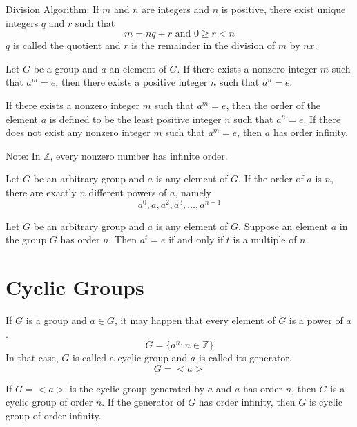 \documentclass[12pt]{article}
\newcommand{\set}[1]{\{ #1 \}}
\newcommand{\integers}{\mathds{Z}}
\begin{document}
\begin{theorem} Division Algorithm: If $m$ and $n$ are integers and $n$ is positive, there exist unique integers $q$ and $r$ such that $$m = nq + r \text{ and } 0 \geq r < n $$ $q$ is called the quotient and $r$ is the remainder in the division of $m$ by $nx$. \end{theorem} 

\begin{definition} Let $G$ be a group and $a$ an element of $G$. If there exists a nonzero integer $m$ such that $a^m = e$, then there exists a positive integer $n$ such that $a^n = e$. \end{definition} 

\begin{definition} If there exists a nonzero integer $m$ such that $a^m = e$, then the order of the element $a$ is defined to be the least positive integer $n$ such that $a^n = e$. If there does not exist any nonzero integer $m$ such that $a^m = e$, then $a$ has order infinity. \end{definition} 

Note: In $\integers$, every nonzero number has infinite order. 

\begin{theorem} Let $G$ be an arbitrary group and $a$ is any element of $G$. If the order of $a$ is $n$, there are exactly $n$ different powers of $a$, namely $$a^0,a, a^2, a^3, \dots, a^{n-1}$$ \end{theorem} 

\begin{theorem} Let $G$ be an arbitrary group and $a$ is any element of $G$. Suppose an element $a$ in the group $G$ has order $n$. Then $a^t = e$ if and only if $t$ is a multiple of $n$. \end{theorem} 

\section{Cyclic Groups}

\begin{definition} If $G$ is a group and $a \in G$, it may happen that every element of $G$ is a power of $a$. $$G = \set{a^n: n \in \integers}$$ In that case, $G$ is called a cyclic group and $a$ is called its generator. $$G = <a>$$ \end{definition} 

\begin{definition} If $G = <a>$ is the cyclic group generated by $a$ and $a$ has order $n$, then $G$ is a cyclic group of order $n$. If the generator of $G$ has order infinity, then $G$ is cyclic group of order infinity. \end{definition} 
\end{document}

